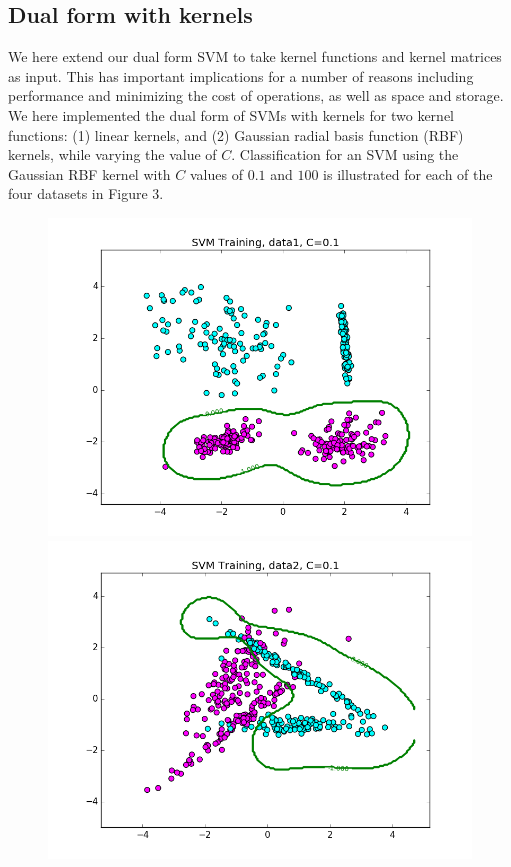 \documentclass{article}
\begin{document}
\subsection{Dual form with kernels}
We here extend our dual form SVM to take kernel functions and kernel matrices as input. This has important implications for a number of reasons including performance and minimizing the cost of operations, as well as space and storage. We here implemented the dual form of SVMs with kernels for two kernel functions: (1) linear kernels, and (2) Gaussian radial basis function (RBF) kernels, while varying the value of $C$. Classification for an SVM using the Gaussian RBF kernel with $C$ values of $0.1$ and $100$ is illustrated for each of the four datasets in Figure 3. \\

\begin{figure}[width=\linewidth]
\centering
\begin{multicols}{2}
  \includegraphics[width=1.2\linewidth]{code/P2/rbf_training,C=01,data1.png}
  \includegraphics[width=1.2\linewidth]{code/P2/rbf_training,C=01,data2.png}

\end{multicols}
\end{figure}
\end{document}
